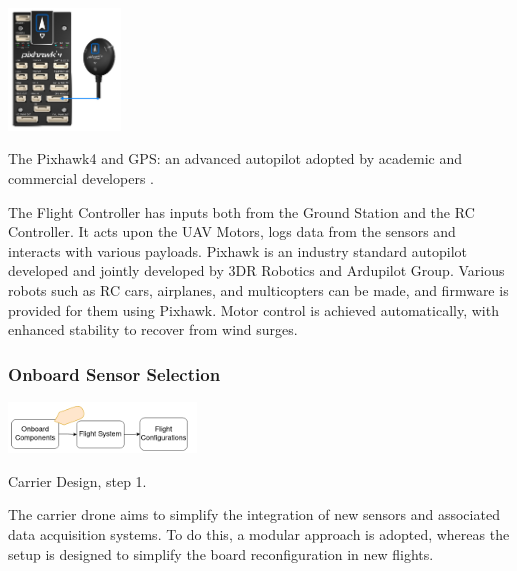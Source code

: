 \begin{marginfigure}%
  \hspace{1cm}
  \includegraphics[width=3cm]{images/stage_system/pixhawk4_compass_gps.jpg}
  \caption{ The Pixhawk4 and GPS: an advanced autopilot adopted by academic and commercial developers \cite{px4_ecosystem}.}
\end{marginfigure}
The Flight Controller has inputs both from the Ground Station and the RC Controller. It acts upon the UAV Motors, logs data from the sensors and interacts with various payloads. Pixhawk \cite{px4_ecosystem} is an industry standard autopilot developed and jointly developed by 3DR Robotics and Ardupilot Group. Various robots such as RC cars, airplanes, and multicopters can be made, and firmware is provided for them using Pixhawk.  Motor control is achieved automatically, with enhanced stability to recover from wind surges. 


\subsubsection{Onboard Sensor Selection}\label{section:sensor_system}

\begin{marginfigure}%
  \vspace{1cm}
  
  \includegraphics[width=5cm]{images/stage_system/drone_setup/components_order1.png}
  \caption{ Carrier Design, step 1.}
\end{marginfigure}

The carrier drone aims to simplify the integration of new sensors and associated data acquisition systems. To do this, a modular approach is adopted, whereas the setup is designed to simplify the board reconfiguration in new flights. 

